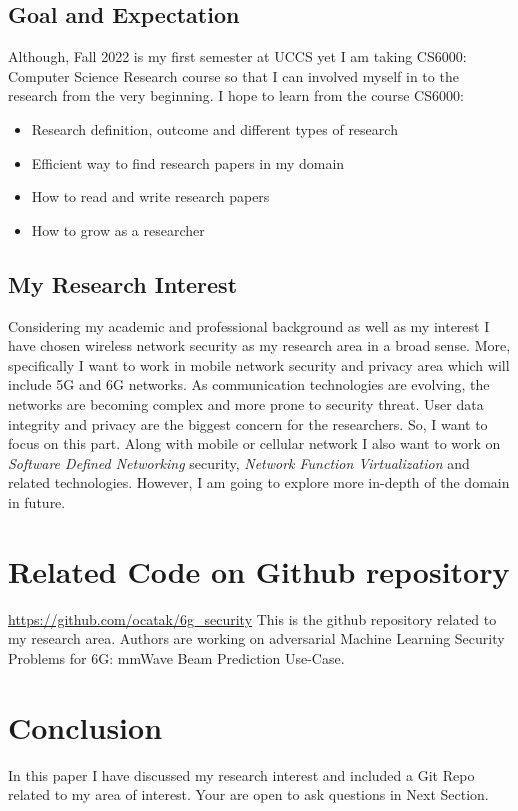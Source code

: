\documentclass[journal]{IEEEtran}
\begin{document}
\subsection{Goal and Expectation}
Although, Fall 2022 is my first semester at UCCS yet I am taking CS6000: Computer Science Research course so that I can involved myself in to the research from the very beginning. I hope to learn from the course CS6000:
\begin{itemize}
    \item Research definition, outcome and different types of research
    \item Efficient way to find research papers in my domain
    \item How to read and write research papers
    \item How to grow as a researcher
\end{itemize}

\subsection{My Research Interest}
Considering my academic and professional background as well as my interest I have chosen wireless network security as my research area in a broad sense. More, specifically I want to work in mobile network security and privacy area which will include 5G and 6G networks. As communication technologies are evolving, the networks are becoming complex and more prone to security threat. User data integrity and privacy are the biggest concern for the researchers. So, I want to focus on this part. Along with mobile or cellular network I also want to work on \textit{Software Defined Networking} security, \textit{Network Function Virtualization} and related technologies. However, I am going to explore more in-depth of the domain in future. 

\section{Related Code on Github  repository}
\url{https://github.com/ocatak/6g_security} This is the github repository related to my research area. Authors are working on adversarial Machine Learning Security Problems for 6G: mmWave Beam Prediction Use-Case.

\section{Conclusion}
In this paper I have discussed my research interest and included a Git Repo related to my area of interest. Your are open to ask questions in Next Section.
\end{document}
